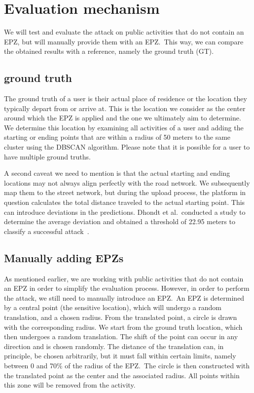 \documentclass[conference]{IEEEtran}
\begin{document}
\section{\textbf{Evaluation mechanism}}
We will test and evaluate the attack on public activities that do not contain
an EPZ, but will manually provide them with an EPZ.\ This way, we can compare
the obtained results with a reference, namely the ground truth (GT).

\subsection{ground truth}
The ground truth of a user is their actual place of residence or the location
they typically depart from or arrive at. This is the location we consider as
the center around which the EPZ is applied and the one we ultimately aim to
determine. We determine this location by examining all activities of a user and
adding the starting or ending points that are within a radius of 50 meters to
the same cluster using the DBSCAN algorithm. Please note that it is possible
for a user to have multiple ground truths.

A second caveat we need to mention is that the actual starting and ending
locations may not always align perfectly with the road network. We subsequently
map them to the street network, but during the upload process, the platform in
question calculates the total distance traveled to the actual starting point.
This can introduce deviations in the predictions. Dhondt et al.\ conducted a
study to determine the average deviation and obtained a threshold of 22.95
meters to classify a successful attack~\cite{Dhondt}.

\subsection{Manually adding EPZs}
As mentioned earlier, we are working with public activities that do not contain
an EPZ in order to simplify the evaluation process. However, in order to
perform the attack, we still need to manually introduce an EPZ.\ An EPZ is
determined by a central point (the sensitive location), which will undergo a
random translation, and a chosen radius. From the translated point, a circle is
drawn with the corresponding radius. We start from the ground truth location,
which then undergoes a random translation. The shift of the point can occur in
any direction and is chosen randomly. The distance of the translation can, in
principle, be chosen arbitrarily, but it must fall within certain limits,
namely between 0 and 70\% of the radius of the EPZ.\ The circle is then
constructed with the translated point as the center and the associated radius.
All points within this zone will be removed from the activity.
\end{document}
